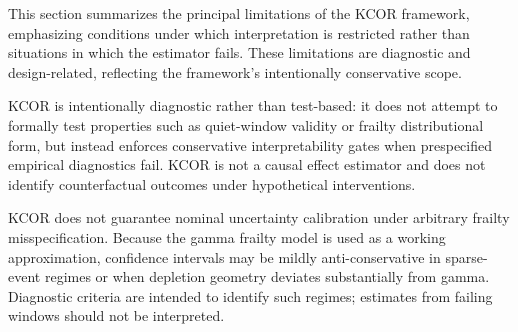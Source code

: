 \documentclass[
]{article}
\begin{document}
This section summarizes the principal limitations of the KCOR framework,
emphasizing conditions under which interpretation is restricted rather
than situations in which the estimator fails. These limitations are
diagnostic and design-related, reflecting the framework's intentionally
conservative scope.

KCOR is intentionally diagnostic rather than test-based: it does not
attempt to formally test properties such as quiet-window validity or
frailty distributional form, but instead enforces conservative
interpretability gates when prespecified empirical diagnostics fail.
KCOR is not a causal effect estimator and does not identify
counterfactual outcomes under hypothetical interventions.

KCOR does not guarantee nominal uncertainty calibration under arbitrary
frailty misspecification. Because the gamma frailty model is used as a
working approximation, confidence intervals may be mildly
anti-conservative in sparse-event regimes or when depletion geometry
deviates substantially from gamma. Diagnostic criteria are intended to
identify such regimes; estimates from failing windows should not be
interpreted.
\end{document}
